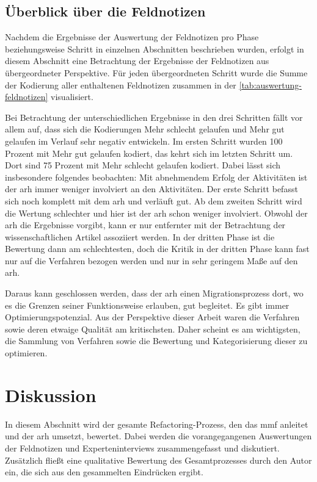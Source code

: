 \subsection{Überblick über die Feldnotizen}

Nachdem die Ergebnisse der Auswertung der Feldnotizen pro Phase beziehungsweise Schritt in einzelnen Abschnitten beschrieben wurden, erfolgt in diesem Abschnitt eine Betrachtung der Ergebnisse der Feldnotizen aus übergeordneter Perspektive.
Für jeden übergeordneten Schritt wurde die Summe der Kodierung aller enthaltenen Feldnotizen zusammen in der \cref{tab:auswertung-feldnotizen} visualisiert.


Bei Betrachtung der unterschiedlichen Ergebnisse in den drei Schritten fällt vor allem auf, dass sich die Kodierungen \glqq Mehr schlecht gelaufen\grqq{} und \glqq Mehr gut gelaufen\grqq{} im Verlauf sehr negativ entwickeln.
Im ersten Schritt wurden 100 Prozent mit \glqq Mehr gut gelaufen\grqq{} kodiert, das kehrt sich im letzten Schritt um.
Dort sind 75 Prozent mit \glqq Mehr schlecht gelaufen\grqq{} kodiert.
Dabei lässt sich insbesondere folgendes beobachten: Mit abnehmendem Erfolg der Aktivitäten ist der \gls{arh} immer weniger involviert an den Aktivitäten.
Der erste Schritt befasst sich noch komplett mit dem \gls{arh} und verläuft gut.
Ab dem zweiten Schritt wird die Wertung schlechter und hier ist der \gls{arh} schon weniger involviert.
Obwohl der \gls{arh} die Ergebnisse vorgibt, kann er nur entfernter mit der Betrachtung der wissenschaftlichen Artikel assoziiert werden.
In der dritten Phase ist die Bewertung dann am schlechtesten, doch die Kritik in der dritten Phase kann fast nur auf die Verfahren bezogen werden und nur in sehr geringem Maße auf den \gls{arh}.

Daraus kann geschlossen werden, dass der \gls{arh} einen Migrationsprozess dort, wo es die Grenzen seiner Funktionsweise erlauben, gut begleitet.
Es gibt immer Optimierungspotenzial.
Aus der Perspektive dieser Arbeit waren die Verfahren sowie deren etwaige Qualität am kritischsten.
Daher scheint es am wichtigsten, die Sammlung von Verfahren sowie die Bewertung und Kategorisierung dieser zu optimieren.

\section{Diskussion}
\label{sec:auswertung-diskussion}

In diesem Abschnitt wird der gesamte Refactoring-Prozess, den das \gls{mmf} anleitet und der \gls{arh} umsetzt, bewertet.
Dabei werden die vorangegangenen Auswertungen der Feldnotizen und Experteninterviews zusammengefasst und diskutiert.
Zusätzlich fließt eine qualitative Bewertung des Gesamtprozesses durch den Autor ein, die sich aus den gesammelten Eindrücken ergibt.


